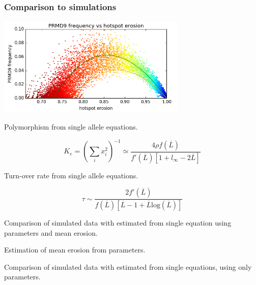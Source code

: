 \documentclass[10pt]{beamer}
\begin{document}
\begin{frame}
	\frametitle{Comparison to simulations}
	\begin{center}
       \includegraphics[width=9cm]{Images/results.png}
	\end{center}
\end{frame}

\begin{frame}
	\begin{center}
		\Large
    Polymorphism from single allele equations.
	\end{center}
\[
  K_e = \left( \sum_i x_i^2  \right)^{-1} \simeq 
  \dfrac{4 \rho f(\overline{L})}{f'(\overline{L})\left[ 1 + l_{\infty} - 2 \overline{L}  \right]}
\]
\end{frame}

\begin{frame}
	\begin{center}
		\Large
    Turn-over rate from single allele equations.
	\end{center}
\[
  \tau \sim \dfrac{2 f'(\overline{L})}{f(\overline{L})[\overline{L}-1 + \overline{L} \mathrm{log}(\overline{L})]}
\]
\end{frame}

\begin{frame}
	\begin{center}
		\Large
    Comparison of simulated data with estimated from single equation using parameters and mean erosion.
	\end{center}
\end{frame}

\begin{frame}
	\begin{center}
		\Large
    Estimation of mean erosion from parameters.
	\end{center}
\end{frame}

\begin{frame}
	\begin{center}
		\Large
    Comparison of simulated data with estimated from single equations, using only parameters.
	\end{center}
\end{frame}
\end{document}
